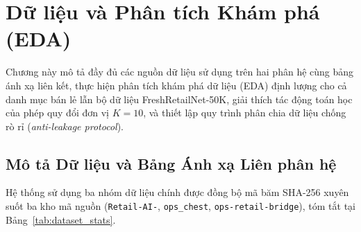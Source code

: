 \chapter{Dữ liệu và Phân tích Khám phá (EDA)}

Chương này mô tả đầy đủ các nguồn dữ liệu sử dụng trên hai phân hệ cùng bảng ánh xạ liên kết, thực hiện phân tích khám phá dữ liệu (EDA) định lượng cho cả danh mục bán lẻ lẫn bộ dữ liệu FreshRetailNet-50K, giải thích tác động toán học của phép quy đổi đơn vị $K=10$, và thiết lập quy trình phân chia dữ liệu chống rò rỉ (\emph{anti-leakage protocol}).

\section{Mô tả Dữ liệu và Bảng Ánh xạ Liên phân hệ}

Hệ thống sử dụng ba nhóm dữ liệu chính được đồng bộ mã băm SHA-256 xuyên suốt ba kho mã nguồn (\texttt{Retail-AI-}, \texttt{ops\_chest}, \texttt{ops-retail-bridge}), tóm tắt tại Bảng~\ref{tab:dataset_stats}.


